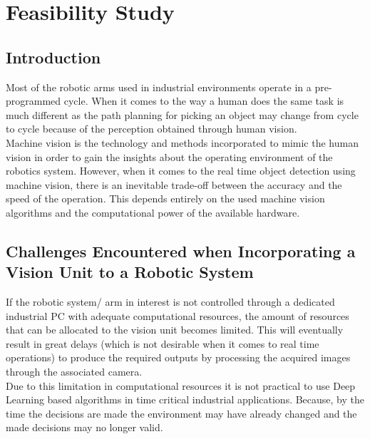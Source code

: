 \documentclass[a4paper,12pt]{book}%
\begin{document}

\tableofcontents





\chapter{Feasibility Study}
\section{Introduction}
Most of the robotic arms used in industrial environments operate in a pre-programmed cycle. When it comes to the way a human does the same task is much different as the path planning for picking an object may change from cycle to cycle because of the perception obtained through human vision.\\

Machine vision is the technology and methods incorporated to mimic the human vision in order to gain the insights about the operating environment of the robotics system. However, when it comes to the real time object detection using machine vision, there is an inevitable trade-off between the accuracy and the speed of the operation. This depends entirely on the used machine vision algorithms and the computational power of the available hardware.

\section{Challenges Encountered when Incorporating  a Vision Unit to a Robotic System}

If the robotic system/ arm in interest is not controlled through a dedicated industrial PC with adequate computational resources, the amount of resources that can be allocated to the vision unit becomes limited.  This will eventually result in great delays (which is not desirable when it comes to real time operations) to produce the required outputs by processing the acquired images through the associated camera.\\

Due to this limitation in computational resources it is not practical to use Deep Learning based algorithms in time critical industrial applications. Because, by the time the decisions are made the environment may have already changed and the made decisions may no longer valid.
\pagebreak
\end{document}
